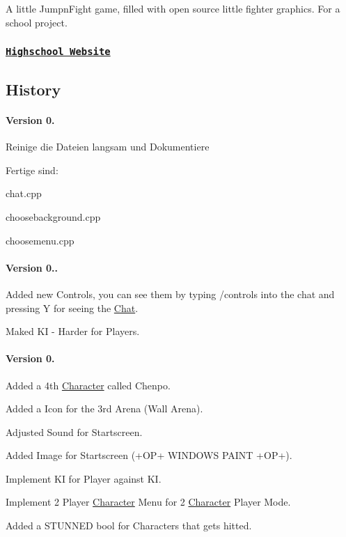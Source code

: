 A little Jump\textquotesingle{}n\textquotesingle{}Fight game, filled with open source little fighter graphics. For a school project.

\subsubsection*{\href{http://www.htw-berlin.de/}{\tt Highschool Website}}

\subsection*{History}

\paragraph*{Version 0.}

Reinige die Dateien langsam und Dokumentiere

Fertige sind\+:

chat.\+cpp

choosebackground.\+cpp

choosemenu.\+cpp

\paragraph*{Version 0..}

Added new Controls, you can see them by typing /controls into the chat and pressing Y for seeing the \hyperlink{class_chat}{Chat}.

Maked K\+I -\/ Harder for Players.

\paragraph*{Version 0.}

Added a 4th \hyperlink{class_character}{Character} called Chenpo.

Added a Icon for the 3rd Arena (Wall Arena).

Adjusted Sound for Startscreen.

Added Image for Startscreen (+\+O\+P+ W\+I\+N\+D\+O\+W\+S P\+A\+I\+N\+T +\+O\+P+).

Implement K\+I for Player against K\+I.

Implement 2 Player \hyperlink{class_character}{Character} Menu for 2 \hyperlink{class_character}{Character} Player Mode.

Added a S\+T\+U\+N\+N\+E\+D bool for Characters that gets hitted.

